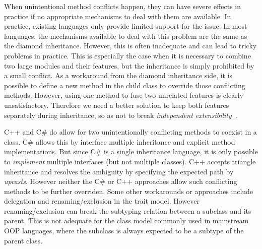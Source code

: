 
When unintentional method conflicts happen, they can have severe
effects in practice if no
appropriate mechanisms to deal with them are available. 
In practice, existing languages only provide limited support for
the issue. In most languages, the mechanisms available to deal with this problem are the same as the diamond
inheritance. However, this is often inadequate and can lead 
to tricky problems in practice. This is especially the case
when it is necessary to combine two large modules and their features,
but the inheritance is simply prohibited by a small conflict. 
As a workaround from the diamond inheritance side, it is possible to
define a new method in the child class to override those conflicting
methods. However, using one method to fuse two unrelated features
is clearly unsatisfactory. Therefore we need a better solution to keep both
features separately during inheritance, so as not to break
\emph{independent extensibility}~\cite{zenger05independentlyextensible}.

C++ and C\# do allow for two
unintentionally conflicting methods to coexist in a class. C\# allows
this by interface multiple inheritance and explicit method
implementations. But since C\# is a single inheritance language, 
it is only possible to \emph{implement} multiple interfaces (but not
multiple classes). %
C++ accepts triangle inheritance and
resolves the ambiguity by specifying the expected path by
\emph{upcasts}. However
neither the C\# or C++ approaches allow
such conflicting methods to be further overriden. 
Some other workarounds or approaches include delegation and
renaming/exclusion in the trait model. However renaming/exclusion 
can break the subtyping relation between a subclass and its parent.
This is not adequate for the class model commonly used in mainstream 
OOP languages, where the subclass is always expected to be a subtype 
of the parent class. 

